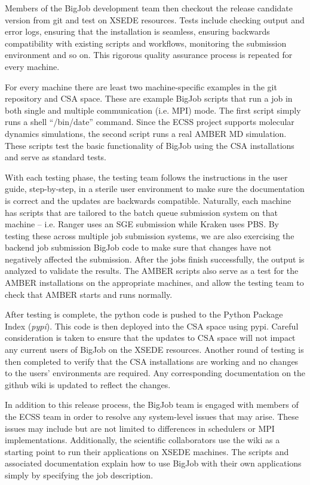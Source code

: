 \documentclass{sig-alternate}
\begin{document}
Members of the BigJob development team then checkout the release candidate
version from git and test on XSEDE resources. Tests include checking output and error logs, 
ensuring that the installation is seamless, ensuring backwards compatibility with existing 
scripts and workflows, monitoring the submission environment and so on. This rigorous quality 
assurance process is repeated for every machine.

For every machine there are least two machine-specific examples in the git
repository and CSA space. These are example BigJob scripts that run a job in
both single and multiple communication (i.e. MPI) mode. The first script simply
runs a shell ``/bin/date'' command. Since the ECSS project supports molecular
dynamics simulations, the second script runs a real AMBER MD simulation. These
scripts test the basic functionality of BigJob using the CSA installations and
serve as standard tests.

With each testing phase, the testing team follows the instructions in the user
guide, step-by-step, in a sterile user environment to make sure the
documentation is correct and the updates are backwards compatible.
Naturally, each machine has scripts that are tailored to the batch queue submission
system on that machine -- i.e. Ranger uses an SGE submission while Kraken uses
PBS. By testing these across multiple job submission systems, we are also
exercising the backend job submission BigJob code to make sure that changes have
not negatively affected the submission. After the jobs finish successfully, the
output is analyzed to validate the results. The AMBER scripts also serve as a
test for the AMBER installations on the appropriate machines, and allow the
testing team to check that AMBER starts and runs normally.

After testing is complete, the python code is pushed to the Python Package Index
(\textit{pypi}). This code is then deployed into the CSA space using pypi.
Careful consideration is taken to ensure that the updates to CSA space
will not impact any current users of BigJob on the XSEDE resources. Another round of testing 
is then completed to verify that the CSA installations are working and no changes to 
the users' environments are required. Any corresponding documentation on the 
github wiki is updated to reflect the changes.

In addition to this release process, the BigJob team is engaged with members
of the ECSS team in order to resolve any system-level issues that may arise.
These issues may include but are not limited to differences in schedulers or MPI
implementations. Additionally, the scientific collaborators use the wiki as a
starting point to run their applications on XSEDE machines. The scripts and
associated documentation explain how to use BigJob with their own applications
simply by specifying the job description. 
\end{document}
